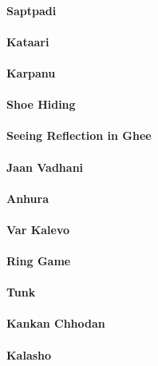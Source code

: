 \paragraph{Saptpadi}

\paragraph{Kataari}

\paragraph{Karpanu}

\paragraph{Shoe Hiding}

\paragraph{Seeing Reflection in Ghee}

\paragraph{Jaan Vadhani}

\paragraph{Anhura}

\paragraph{Var Kalevo}

\paragraph{Ring Game}

\paragraph{Tunk}

\paragraph{Kankan Chhodan}

\paragraph{Kalasho}

